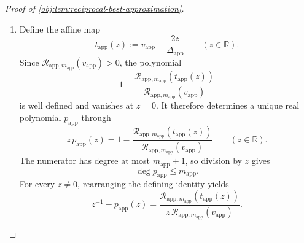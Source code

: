 \documentclass[11pt]{article}
\begin{document}
\begin{proof}[Proof of \cref{obj:lem:reciprocal-best-approximation}]
\begin{enumerate}
\item Define the affine map
\[
t_{\mathrm{app}}(z):=
v_{\mathrm{app}}-\frac{2z}{\Delta_{\mathrm{app}}}
\qquad(z\in\mathbb R).
\]
Since \(\mathcal R_{\mathrm{app},m_{\mathrm{app}}}
(v_{\mathrm{app}})>0\), the polynomial
\[
1-
\frac{\mathcal R_{\mathrm{app},m_{\mathrm{app}}}
(t_{\mathrm{app}}(z))}
{\mathcal R_{\mathrm{app},m_{\mathrm{app}}}(v_{\mathrm{app}})}
\]
is well defined and vanishes at \(z=0\). It therefore determines a unique real polynomial \(p_{\mathrm{app}}\) through
\[
z\,p_{\mathrm{app}}(z)
=
1-
\frac{\mathcal R_{\mathrm{app},m_{\mathrm{app}}}
(t_{\mathrm{app}}(z))}
{\mathcal R_{\mathrm{app},m_{\mathrm{app}}}(v_{\mathrm{app}})}
\qquad(z\in\mathbb R).
\]
The numerator has degree at most \(m_{\mathrm{app}}+1\), so division by \(z\) gives
\[
\deg p_{\mathrm{app}}\le m_{\mathrm{app}}.
\]
For every \(z\ne0\), rearranging the defining identity yields
\[
z^{-1}-p_{\mathrm{app}}(z)
=
\frac{\mathcal R_{\mathrm{app},m_{\mathrm{app}}}
(t_{\mathrm{app}}(z))}
{z\,\mathcal R_{\mathrm{app},m_{\mathrm{app}}}
(v_{\mathrm{app}})}.
\]


\end{enumerate}
\end{proof}
\end{document}
